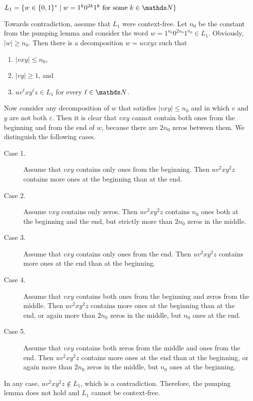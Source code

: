 \documentclass{exercise}
\begin{document}
\subtask $L_1=\{w\in\{0,1\}^*\mid w=1^k0^{2k}1^k \text{ for some } k\in\nat\}$
  \begin{solution}
    Towards contradiction, assume that $L_1$ were context-free.  Let $n_0$ be the
    constant from the pumping lemma and consider the word
    $w = 1^{n_0}0^{2n_0}1^{n_0} \in L_1$.  Obviously, $|w| \ge n_0$.  Then there
    is a decomposition $w = uvxyz$ such that
    \begin{enumerate}[label=\arabic*.]
      \item $|vxy| \le n_0$,
      \item $|vy| \ge 1$, and
      \item $uv^{\ell}xy^{\ell}z \in L_1$ for every $\ell\in\nat$.
    \end{enumerate}
    Now consider any decomposition of $w$ that satisfies $|vxy| \le n_0$
    and in which $v$ and $y$ are not both $\varepsilon$.
    Then it is clear that $vxy$ cannot contain both ones from the
    beginning and from the end of $w$, because there are $2n_0$ zeros
    between them.  We distinguish the following cases.
    \begin{description}
      \item[Case 1.] Assume that $vxy$ contains only ones from the beginning.
        Then $uv^2xy^2z$ contains more ones at the beginning than at the end.
      \item[Case 2.] Assume $vxy$ contains only zeros.  Then $uv^2xy^2z$
        contains $n_0$ ones both at the beginning and the end, but strictly
        more than $2n_0$ zeros in the middle.
      \item[Case 3.] Assume that $vxy$ contains only ones from the end.
        Then $uv^2xy^2z$ contains more ones at the end than at the beginning.
      \item[Case 4.] Assume that $vxy$ contains both ones from the beginning
        and zeros from the middle.  Then $uv^2xy^2z$ contains
        more ones at the beginning than at the end, or again more than $2n_0$
        zeros in the middle, but $n_0$ ones at the end. 
      \item[Case 5.] Assume that $vxy$ contains both zeros from the middle
        and ones from the end.  Then $uv^2xy^2z$ contains more ones
        at the end than at the beginning, or again more than $2n_0$ zeros in the
        middle, but $n_0$ ones at the beginning.
    \end{description}
    In any case, $uv^2xy^2z\notin L_1$, which is a contradiction.  Therefore,
    the pumping lemma does not hold and $L_1$ cannot be context-free.
    

\end{solution}
\end{document}
